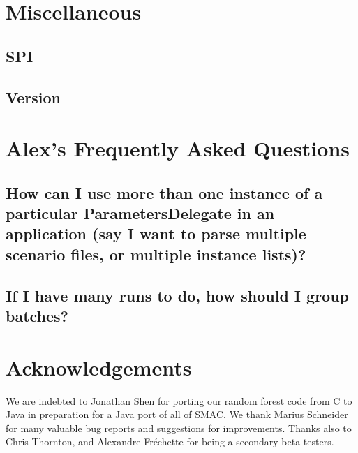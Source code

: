 \documentclass[11pt,letterpaper,oneside]{article}
\begin{document}
\section{Miscellaneous}


\subsection{SPI}
\label{sec:misc-spi}

\subsection{Version}
\label{sec:version}



\section{Alex's Frequently Asked Questions}

\subsection{How can I use more than one instance of a particular ParametersDelegate in an application (say I want to parse multiple scenario files, or multiple instance lists)?}

\subsection{If I have many runs to do, how should I group batches?}




\section{Acknowledgements}

We are indebted to Jonathan Shen for porting our random forest code from C to Java in preparation for a Java port of all of SMAC. We thank Marius Schneider for many valuable bug reports and suggestions for improvements. Thanks also to Chris Thornton, and Alexandre Fr\'echette for being a secondary beta testers.


\renewcommand{\bibsection}{\section{References}}


\end{document}
